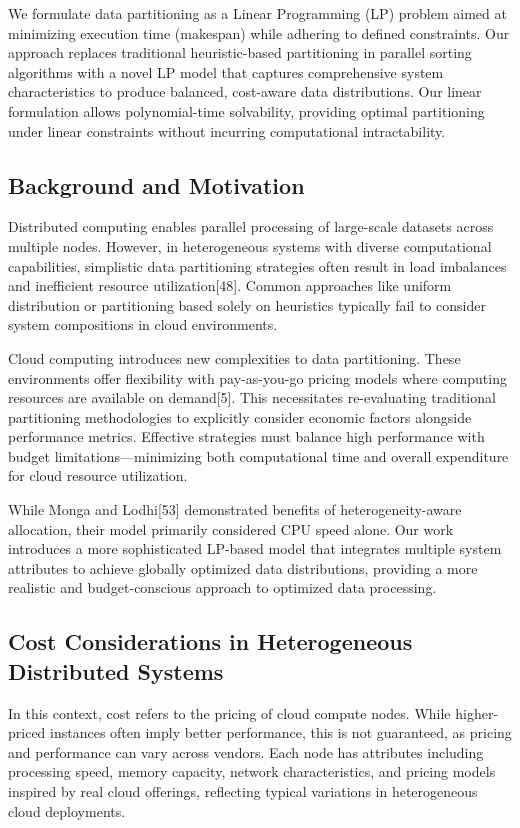 \documentclass[]{interact}
\theoremstyle{plain}
\theoremstyle{definition}
\theoremstyle{remark}
\begin{document}
We formulate data partitioning as a Linear Programming (LP) problem aimed at minimizing execution time (makespan) while adhering to defined constraints. Our approach replaces traditional heuristic-based partitioning in parallel sorting algorithms with a novel LP model that captures comprehensive system characteristics to produce balanced, cost-aware data distributions. Our linear formulation allows polynomial-time solvability, providing optimal partitioning under linear constraints without incurring computational intractability.

\subsection{Background and Motivation}

Distributed computing enables parallel processing of large-scale datasets across multiple nodes. However, in heterogeneous systems with diverse computational capabilities, simplistic data partitioning strategies often result in load imbalances and inefficient resource utilization[48]. Common approaches like uniform distribution or partitioning based solely on heuristics typically fail to consider system compositions in cloud environments.

Cloud computing introduces new complexities to data partitioning. These environments offer flexibility with pay-as-you-go pricing models where computing resources are available on demand[5]. This necessitates re-evaluating traditional partitioning methodologies to explicitly consider economic factors alongside performance metrics. Effective strategies must balance high performance with budget limitations—minimizing both computational time and overall expenditure for cloud resource utilization. 

While Monga and Lodhi[53] demonstrated benefits of heterogeneity-aware allocation, their model primarily considered CPU speed alone. Our work introduces a more sophisticated LP-based model that integrates multiple system attributes to achieve globally optimized data distributions, providing a more realistic and budget-conscious approach to optimized data processing.

\subsection{Cost Considerations in Heterogeneous Distributed Systems}

In this context, cost refers to the pricing of cloud compute nodes. While higher-priced instances often imply better performance, this is not guaranteed, as pricing and performance can vary across vendors. Each node has attributes including processing speed, memory capacity, network characteristics, and pricing models inspired by real cloud offerings, reflecting typical variations in heterogeneous cloud deployments.
\end{document}
